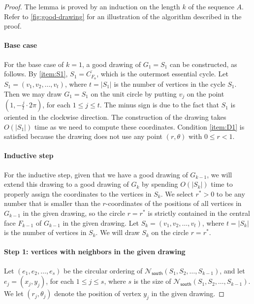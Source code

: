 \documentclass{article}\usepackage[a4paper,margin=20mm]{geometry}
\newcommand{\FO}{F_\mathsf{o}}
\newcommand{\Nsouth}{\mathcal{N}_\mathsf{south}}
\begin{document}
\begin{proof} The lemma is proved by an induction on the length $k$  of the sequence $A$. Refer to \cref{fig:good-drawing} for an illustration of the algorithm described in the proof.

\paragraph{Base case}
For the base case of $k=1$, a good drawing of $G_1 = S_1$ can be constructed, as follows. By \ref{item:S1},  $S_1 = \overline{C_{\FO}}$, which is the outermost essential cycle. Let $S_1 = (v_1, v_2, \ldots, v_t)$, where $t = |S_1|$ is the number of vertices in the cycle $S_1$. Then we may draw $G_1 = S_1$ on the unit circle by putting $v_j$ on the point $\left(1, -\frac{j}{t} \cdot 2\pi \right)$, for each $1 \leq j \leq t$. The minus sign is due to the fact that $S_1$ is oriented in the clockwise direction. The construction of the drawing takes $O\left(|S_1|\right)$ time as we need to compute these coordinates. Condition \ref{item:D1} is satisfied because the drawing does not use any point $(r,\theta)$ with $0\leq r<1$. 


\paragraph{Inductive step}
For the inductive step, given that we have a good drawing of $G_{k-1}$, we will extend this drawing to a good drawing of $G_{k}$ by spending $O\left(|S_k|\right)$ time to properly assign the coordinates to the vertices in $S_k$. We select $r^\ast > 0$ to be any number that is smaller than the $r$-coordinates of the positions of all vertices in $G_{k-1}$ in the given drawing, so the circle $r = r^\ast$ is strictly contained in the central face $F_{k-1}$ of $G_{k-1}$ in the given drawing. 
Let $S_k = (v_1, v_2, \ldots, v_t)$, where $t = |S_k|$ is the number of vertices in $S_k$.  We will draw $S_k$ on the circle $r = r^\ast$.

\paragraph{Step 1: vertices with neighbors in the given drawing}
Let $(e_1, e_2, \ldots, e_s)$ be the circular ordering of $\Nsouth(S_1, S_2, \ldots, S_{k-1})$, and let $e_j=(x_j, y_j)$, for each $1 \leq j \leq s$, where $s$ is the size of $\Nsouth(S_1, S_2, \ldots, S_{k-1})$.  We let $(r_j, \theta_j)$ denote the position of vertex $y_j$ in the given drawing.


\end{proof}
\end{document}
